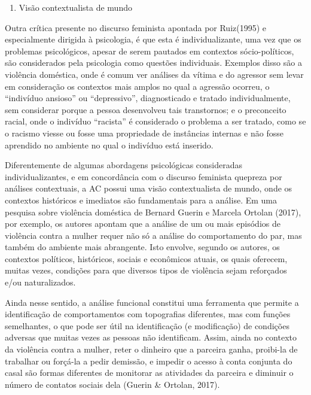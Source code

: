 \begin{enumerate}[resume]
    \item Visão contextualista de mundo
\end{enumerate} 

Outra crítica presente no discurso feminista apontada por Ruiz\linebreak (1995) e especialmente dirigida à psicologia, é que esta é individualizante, uma vez que os problemas psicológicos, apesar de serem pautados em contextos sócio-políticos, são considerados pela psicologia como questões individuais. Exemplos disso são a violência doméstica, onde é comum ver análises da vítima e do agressor sem levar em consideração os contextos mais amplos no qual a agressão ocorreu, o ``indivíduo ansioso'' ou ``depressivo'', diagnosticado e tratado individualmente, sem considerar porque a pessoa desenvolveu tais transtornos; e o preconceito racial, onde o indivíduo ``racista'' é considerado o problema a ser tratado, como se o racismo viesse ou fosse uma propriedade de instâncias internas e não fosse aprendido no ambiente no qual o indivíduo está inserido. 

Diferentemente de algumas abordagens psicológicas consideradas individualizantes, e em concordância com o discurso feminista que\linebreak preza por análises contextuais, a AC possui uma visão contextualista de mundo, onde os contextos históricos e imediatos são fundamentais para a análise. Em uma pesquisa sobre violência doméstica de Bernard Guerin e Marcela Ortolan (2017), por exemplo, os autores apontam que a análise de um ou mais episódios de violência contra a mulher requer não só a análise do comportamento do par, mas também do ambiente mais abrangente. Isto envolve, segundo os autores, os contextos políticos, históricos, sociais e econômicos atuais, os quais oferecem, muitas vezes, condições para que diversos tipos de violência sejam reforçados e/ou naturalizados. 

Ainda nesse sentido, a análise funcional constitui uma ferramenta que permite a identificação de comportamentos com topografias diferentes, mas com funções semelhantes, o que pode ser útil na identificação (e modificação) de condições adversas que muitas vezes as pessoas não identificam. Assim, ainda no contexto da violência contra a mulher, reter o dinheiro que a parceira ganha, proibi-la de trabalhar ou forçá-la a pedir demissão, e impedir o acesso à conta conjunta do casal são formas diferentes de monitorar as atividades da parceira e diminuir o número de contatos sociais dela (Guerin \& Ortolan, 2017).


